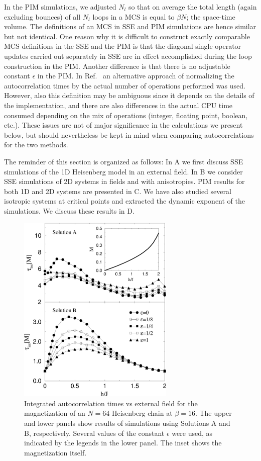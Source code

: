 \documentclass[10pt,pre,aps,twocolumn,showpacs,superscriptaddress,
floatfix]{revtex4}
\begin{document}
In the PIM simulations, we adjusted $N_l$ so that on average the total length 
(again excluding bounces) of all $N_l$ loops in a MCS is equal to $\beta N$; 
the space-time volume. The definitions of an MCS in SSE and PIM simulations 
are hence similar but not identical. One reason why it is difficult to
construct exactly comparable MCS definitions in the SSE and the PIM is that 
the diagonal single-operator updates carried out separately in SSE are in 
effect accomplished during the loop construction in the PIM. Another 
difference is that there is no adjustable constant $\epsilon$ in the PIM. 
In Ref.~\cite{dorneich2} an alternative approach of normalizing the 
autocorrelation times by the actual number of operations performed was 
used. However, also this definition may be ambiguous since it depends on 
the details of the implementation, and there are also differences in the 
actual CPU time consumed depending on the mix of operations (integer, 
floating point, boolean, etc.). These issues are not of major significance 
in the calculations we present below, but should nevertheless be kept in 
mind when comparing autocorrelations for the two methods. 

The reminder of this section is organized as follows: In A we first discuss 
SSE simulations of the 1D Heisenberg model in an external field. In B we
consider SSE simulations of 2D systems in fields and with anisotropies. PIM
results for both 1D and 2D systems are presented in C. We have also studied 
several isotropic systems at critical points and extracted the dynamic 
exponent of the simulations. We discuss these results in D.

\begin{figure}
\includegraphics[clip,width=7.5cm]{fig13.eps}
\caption{Integrated autocorrelation times vs external field for the 
magnetization of an $N=64$ Heisenberg chain at $\beta=16$. The upper
and lower panels show results of simulations using Solutions A and B,
respectively. Several values of the constant $\epsilon$ were used, as 
indicated by the legends in the lower panel. The inset shows the 
magnetization itself.} 
\label{l64_m}
\end{figure}
\end{document}
